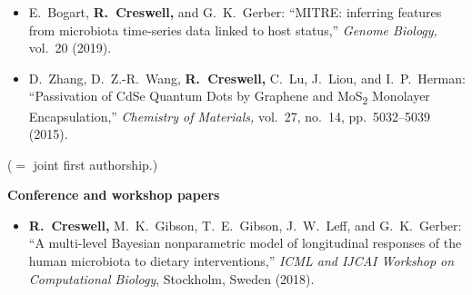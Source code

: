 \documentclass[11pt]{article}
\begin{document}
\begin{itemize}[leftmargin=*]
\item {\color{gray} E.\ Bogart, \textbf{\color{black}R.\ Creswell,} and G.\ K.\ Gerber:} ``MITRE: inferring features from microbiota time-series data linked to host status,'' \emph{Genome Biology,} vol.\ 20 (2019).

\item {\color{gray} D.\ Zhang, D.\ Z.-R.\ Wang, \textbf{\color{black}R.\ Creswell,} C.\ Lu, J.\ Liou, and I.\ P.\ Herman:} ``Passivation of CdSe Quantum Dots by Graphene and MoS\textsubscript{2} Monolayer Encapsulation,'' \emph{Chemistry of Materials,} vol.\ 27, no.\ 14, pp.\ 5032--5039 (2015).
\end{itemize}
\hfill(\textsuperscript{\dag}$=$ joint first authorship.)

\vspace*{.4cm}
\noindent\textbf{Conference and workshop papers}
\vspace*{.5cm}
\begin{itemize}[leftmargin=*]
\setlength{\itemsep}{4pt}
\setlength{\parskip}{0pt}
\setlength{\parsep}{0pt}
\vspace{-.5cm}
\item \textbf{R.\ Creswell,} {\color{gray} M.\ K.\ Gibson, T.\ E.\ Gibson, J.\ W.\ Leff, and G.\ K.\ Gerber:} ``A multi-level Bayesian nonparametric model of longitudinal responses of the human microbiota to dietary interventions,'' \emph{ICML and IJCAI
Workshop on Computational Biology}, Stockholm, Sweden (2018).
\end{itemize}



\end{document}
